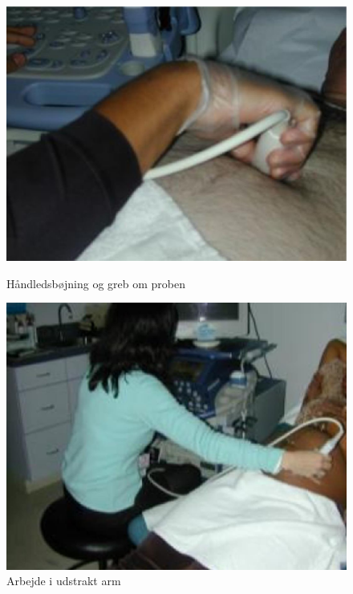 \begin{figure}[H]
  \begin{minipage}{0.49\textwidth}
    \centering
      \includegraphics[width=\textwidth]{Figurer/wrist.jpg}
      \caption{Håndledsbøjning og greb om proben \cite{31}}
    \label{wrist}
  \end{minipage}
  \hspace{0.02\textwidth}
  \begin{minipage}{0.47\textwidth}
    \centering
      \includegraphics[width=\textwidth]{Figurer/arm.jpg}
      \caption{Arbejde i udstrakt arm \cite{31}}
    \label{udstraktArm}
  \end{minipage}
\end{figure}


